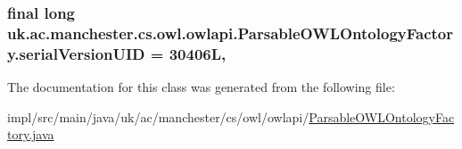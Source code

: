 \hypertarget{classuk_1_1ac_1_1manchester_1_1cs_1_1owl_1_1owlapi_1_1_parsable_o_w_l_ontology_factory_a03e4f6fa7d136dad80c2ef02d5360550}{
\subsubsection[{serial\-Version\-U\-I\-D}]{\setlength{\rightskip}{0pt plus 5cm}final long uk.\-ac.\-manchester.\-cs.\-owl.\-owlapi.\-Parsable\-O\-W\-L\-Ontology\-Factory.\-serial\-Version\-U\-I\-D = 30406\-L\hspace{0.3cm}{\ttfamily [static]}, {\ttfamily [private]}}}\label{classuk_1_1ac_1_1manchester_1_1cs_1_1owl_1_1owlapi_1_1_parsable_o_w_l_ontology_factory_a03e4f6fa7d136dad80c2ef02d5360550}


The documentation for this class was generated from the following file\-:\begin{DoxyCompactItemize}
\item 
impl/src/main/java/uk/ac/manchester/cs/owl/owlapi/\hyperlink{_parsable_o_w_l_ontology_factory_8java}{Parsable\-O\-W\-L\-Ontology\-Factory.\-java}\end{DoxyCompactItemize}

